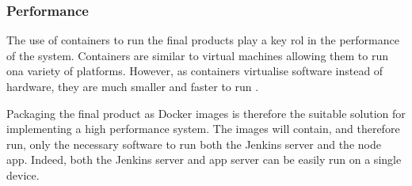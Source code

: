   \subsubsection{Performance}
  The use of containers to run the final products play a key rol in the performance of the system. Containers are similar to virtual machines allowing them to run ona variety of platforms. However, as containers virtualise software instead of hardware, they are much smaller and faster to run \citep{docker}.
  
  Packaging the final product as Docker images is therefore the suitable solution for implementing a high performance system. The images will contain, and therefore run, only the necessary software to run both the Jenkins server and the node app. Indeed, both the Jenkins server and app server can be easily run on a single device.
  